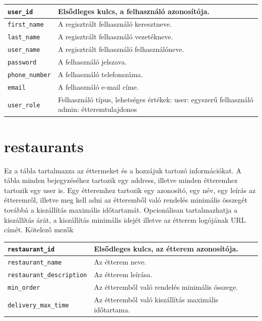 \begin{tabular}{|p{3cm}|p{10cm}|}
\hline
\texttt{user\_id} & Elsődleges kulcs, a felhasználó azonosítója. \\
\hline
\texttt{first\_name} & A regisztrált felhasználó keresztneve. \\
\hline
\texttt{last\_name} & A regisztrált felhasználó vezetékneve. \\
\hline
\texttt{user\_name} & A regisztrált felhasználó felhasználóneve. \\
\hline
\texttt{password} & A felhasználó jelszava. \\
\hline
\texttt{phone\_number} & A felhasználó telefonszáma. \\
\hline
\texttt{email} & A felhasználó e-mail címe. \\
\hline
\texttt{user\_role} & Felhasználó típus, lehetséges értékek: user: egyszerű felhasználó admin: étteremtulajdonos \\
\hline
\end{tabular}

\section{restaurants}

Ez a tábla tartalmazza az éttermeket és a hozzájuk tartozó információkat. A tábla minden bejegyzéséhez tartozik egy address, illetve minden étteremhez tartozik egy user is. Egy étteremhez tartozik egy azonosító, egy név, egy leírás az étteremről, illetve meg kell adni az étteremből való rendelés minimális összegét továbbá a kiszállítás maximális időtartamát. Opcionálisan tartalmazhatja a kiszállítás árát, a kiszállítás minimális idejét illetve az étterem logójának URL címét.
Kötelező mezők

\begin{tabular}{|p{3cm}|p{10cm}|}
    \hline
    \texttt{restaurant\_id} & Elsődleges kulcs, az étterem azonosítója. \\
    \hline
    \texttt{restaurant\_name} & Az étterem neve. \\
    \hline
    \texttt{restaurant\_description} & Az étterem leírása. \\
    \hline
    \texttt{min\_order} & Az étteremből való rendelés minimális összege. \\
    \hline
    \texttt{delivery\_max\_time} & Az étteremből való kiszállítás maximális időtartama. \\
    \hline
\end{tabular}

